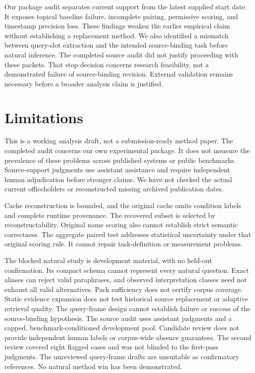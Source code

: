 \documentclass[11pt]{article}
\begin{document}
Our package audit separates current support from the latest supplied start date.
It exposes topical baseline failure, incomplete pairing, permissive scoring, and timestamp precision loss.
These findings weaken the earlier empirical claim without establishing a replacement method.
We also identified a mismatch between query-slot extraction and the intended source-binding task before natural inference.
The completed source audit did not justify proceeding with these packets.
That stop decision concerns research feasibility, not a demonstrated failure of source-binding revision.
External validation remains necessary before a broader analysis claim is justified.
\label{v26-main-end}

\clearpage
\section*{Limitations}

This is a working analysis draft, not a submission-ready method paper.
The completed audit concerns our own experimental package.
It does not measure the prevalence of these problems across published systems or public benchmarks.
Source-support judgments use assistant assistance and require independent human adjudication before stronger claims.
We have not checked the actual current officeholders or reconstructed missing archived publication dates.

Cache reconstruction is bounded, and the original cache omits condition labels and complete runtime provenance.
The recovered subset is selected by reconstructability.
Original name scoring also cannot establish strict semantic correctness.
The aggregate paired test addresses statistical uncertainty under that original scoring rule.
It cannot repair task-definition or measurement problems.

The blocked natural study is development material, with no held-out confirmation.
Its compact schema cannot represent every natural question.
Exact aliases can reject valid paraphrases, and observed interpretation classes need not exhaust all valid alternatives.
Pack sufficiency does not certify corpus coverage.
Static evidence expansion does not test historical source replacement or adaptive retrieval quality.
The query-frame design cannot establish failure or success of the source-binding hypothesis.
The source audit uses assistant judgments and a capped, benchmark-conditioned development pool.
Candidate review does not provide independent human labels or corpus-wide absence guarantees.
The second review covered eight flagged cases and was not blinded to the first-pass judgments.
The unreviewed query-frame drafts are unsuitable as confirmatory references.
No natural method win has been demonstrated.
\end{document}

